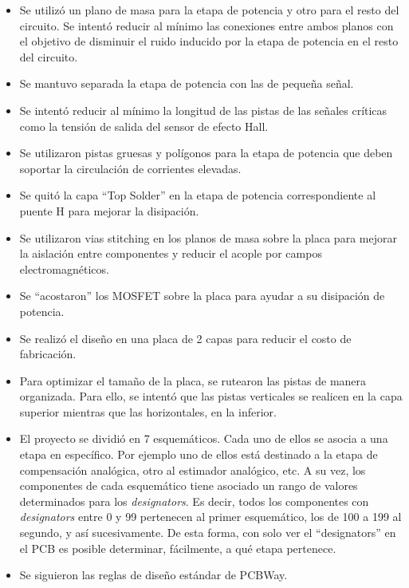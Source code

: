 \begin{itemize}
	\item Se utilizó un plano de masa para la etapa de potencia y otro para el resto del circuito. Se intentó reducir al mínimo las conexiones entre ambos planos con el objetivo de disminuir el ruido inducido por la etapa de potencia en el resto del circuito.
	\item Se mantuvo separada la etapa de potencia con las de pequeña señal.
	\item Se intentó reducir al mínimo la longitud de las pistas de las señales críticas como la tensión de salida del sensor de efecto Hall.
	\item Se utilizaron pistas gruesas y polígonos para la etapa de potencia que deben soportar la circulación de corrientes elevadas.
	\item Se quitó la capa ``Top Solder'' en la etapa de potencia correspondiente al puente H para mejorar la disipación.
	\item Se utilizaron vias stitching en los planos de masa sobre la placa para mejorar la aislación entre componentes y reducir el acople por campos electromagnéticos.
	\item Se ``acostaron'' los MOSFET sobre la placa para ayudar a su disipación de potencia.
	\item Se realizó el diseño en una placa de 2 capas para reducir el costo de fabricación.
	\item Para optimizar el tamaño de la placa, se rutearon las pistas de manera organizada. Para ello, se intentó que las pistas verticales se realicen en la capa superior mientras que las horizontales, en la inferior.
	\item El proyecto se dividió en 7 esquemáticos. Cada uno de ellos se asocia a una etapa en específico. Por ejemplo uno de ellos está destinado a la etapa de compensación analógica, otro al estimador analógico, etc. A su vez, los componentes de cada esquemático tiene asociado un rango de valores determinados para los \textsl{designators}. Es decir, todos los componentes con \textsl{designators} entre 0 y 99 pertenecen al primer esquemático, los de 100 a 199 al segundo, y así sucesivamente.  De esta forma, con solo ver el ``designators'' en el PCB es posible determinar, fácilmente, a qué etapa pertenece.  
	\item Se siguieron las reglas de diseño estándar de PCBWay.
	
\end{itemize}



